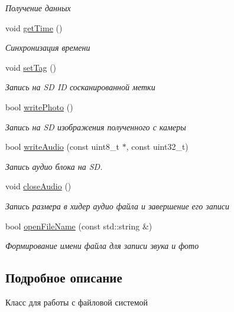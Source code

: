 \begin{DoxyCompactItemize}
\begin{DoxyCompactList}\small\item\em Получение данных \end{DoxyCompactList}\item 
void \hyperlink{classunit_1_1_t_file_system_aaf4766a6f4dcd6759e362ffc977615f5}{get\+Time} ()
\begin{DoxyCompactList}\small\item\em Синхронизация времени \end{DoxyCompactList}\item 
void \hyperlink{classunit_1_1_t_file_system_a79523b2edca3574ec6254af671f28256}{set\+Tag} ()
\begin{DoxyCompactList}\small\item\em Запись на SD ID сосканированной метки \end{DoxyCompactList}\item 
bool \hyperlink{classunit_1_1_t_file_system_aacd7aae1827432b04c06b9a1d440b949}{write\+Photo} ()
\begin{DoxyCompactList}\small\item\em Запись на SD изображения полученного с камеры \end{DoxyCompactList}\item 
bool \hyperlink{classunit_1_1_t_file_system_a01199e9b6421790c5954dbc69ef84ae2}{write\+Audio} (const uint8\+\_\+t $\ast$, const uint32\+\_\+t)
\begin{DoxyCompactList}\small\item\em Запись аудио блока на SD. \end{DoxyCompactList}\item 
void \hyperlink{classunit_1_1_t_file_system_ae30e2668ef7405051b427660fa866302}{close\+Audio} ()
\begin{DoxyCompactList}\small\item\em Запись размера в хидер аудио файла и завершение его записи \end{DoxyCompactList}\item 
bool \hyperlink{classunit_1_1_t_file_system_a80f8d844c27c27cb5998b2d2214d041a}{open\+File\+Name} (const std\+::string \&)
\begin{DoxyCompactList}\small\item\em Формирование имени файла для записи звука и фото \end{DoxyCompactList}\end{DoxyCompactItemize}


\subsection{Подробное описание}
Класс для работы с файловой системой 

